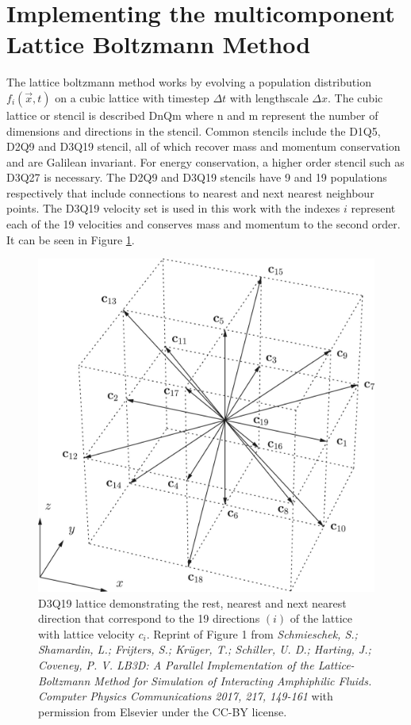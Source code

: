 \section{Implementing the multicomponent Lattice Boltzmann Method} 
\label{section:lbm_hydrodynamics}

The lattice boltzmann method works by evolving a population distribution $f_{i}(\vec{x}, t)$ on a cubic lattice with 
timestep $\Delta t$ with lengthscale $\Delta x$. \cite{qian_lattice_1992, succi_lattice_2018, he_theory_1997} The cubic lattice or stencil is described
DnQm where n and m represent the number of dimensions and directions in the stencil. \cite{succi_lattice_2018, schmieschek_lb3d_2017}
Common stencils include the D1Q5, D2Q9 and D3Q19 stencil, all of which recover mass and momentum conservation and are Galilean invariant.
For energy conservation, a higher order stencil such as D3Q27 is necessary. The D2Q9 and D3Q19 stencils have 9 and 19 populations respectively that include 
connections to nearest and next nearest neighbour points. The D3Q19 
velocity set is used in this work with the indexes $i$ represent each of the 19 velocities and conserves mass and momentum 
to the second order. It can be seen in Figure \ref{fig:d3q19_lattice}. 

\begin{figure}[h]
    \centering
    \includegraphics[scale = 1]{figures/methods/d3q19_lattice.jpg}
    \caption{D3Q19 lattice demonstrating the rest, nearest and next nearest direction that correspond to the 19 
    directions $(i)$ of the lattice with lattice velocity $c_{i}$. Reprint of Figure 1 from
    \textit{Schmieschek, S.; Shamardin, L.; Frijters, S.; Krüger, T.; Schiller, U. D.; Harting, J.; Coveney, P. V. LB3D: A Parallel Implementation of the Lattice-Boltzmann Method for Simulation of Interacting Amphiphilic Fluids. Computer Physics Communications 2017, 217, 149-161} 
    with permission from Elsevier under the CC-BY license.}
    \label{fig:d3q19_lattice}
\end{figure}

